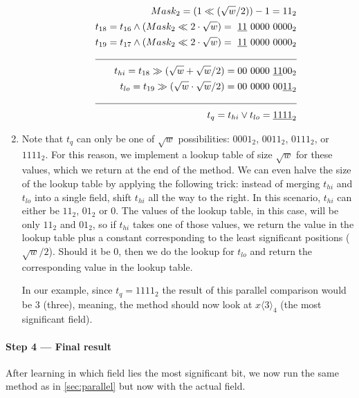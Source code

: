 \begin{enumerate}
\begin{enumerate}
        \begin{align*}
            Mask_2 = (1 \ll (\sqrt{w}/2)) - 1 = 11_2&\\
            t_{18} = t_{16} \wedge (Mask_2 \ll 2\cdot \sqrt{w}) =\ \underline{11}\ 0000\ 0000_2& \\
            t_{19} = t_{17} \wedge (Mask_2 \ll 2\cdot \sqrt{w}) =\ \underline{11}\ 0000\ 0000_2& \\
            \cline{1-2}
            t_{hi} = t_{18} \gg (\sqrt{w} + \sqrt{w}/2) = 00\ 0000\ \underline{11}00_2 &\\
            t_{lo} = t_{19} \gg (\sqrt{w} \cdot \sqrt{w} / 2) = 00\ 0000\ 00 \underline{11}_2 &\\
            \cline{1-2}
            t_{q} = t_{hi} \vee t_{lo} = \underline{1111}_2 &\\
        \end{align*}
    \end{enumerate}
    \item
    Note that $t_q$ can only be one of $\sqrt{w}$ possibilities: $0001_2$, $0011_2$, $0111_2$, or $1111_2$. For this reason, we implement a lookup table of size $\sqrt{w}$ for these values, which we return at the end of the method. We can even halve the size of the lookup table by applying the following trick: instead of merging $t_{hi}$ and $t_{lo}$ into a single field, shift $t_{hi}$ all the way to the right. In this scenario, $t_{hi}$ can either be $11_2$, $01_2$ or $0$. The values of the lookup table, in this case, will be only $11_2$ and $01_2$, so if $t_{hi}$ takes one of those values, we return the value in the lookup table plus a constant corresponding to the least significant positions ($\sqrt{w}/2$). Should it be $0$, then we do the lookup for $t_{lo}$ and return the corresponding value in the lookup table.
    
    In our example, since $t_{q} = 1111_2$ the result of this parallel comparison would be $3$ (three), meaning, the method should now look at $x\langle 3\rangle_4$ (the most significant field).
\end{enumerate}

\paragraph{Step 4 --- Final result}
After learning in which field lies the most significant bit, we now run the same method as in \ref{sec:parallel} but now with the actual field.

